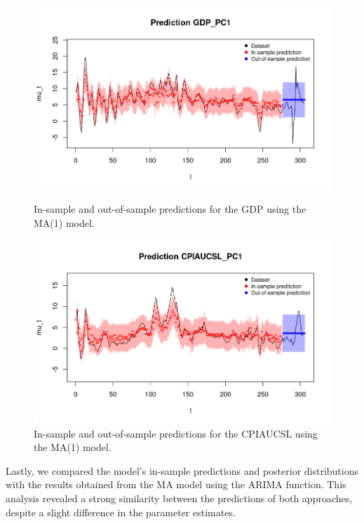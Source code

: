 \begin{figure}[H]
    \centering
    \begin{minipage}{0.49\textwidth}
        \centering
        \includegraphics[width=\textwidth]{images/3-MA/gdp_prediction.png}
        \caption{In-sample and out-of-sample predictions for the GDP using the MA(1) model.}
        \label{fig:MA1_gdp_prediction}
    \end{minipage}\hfill
    \begin{minipage}{0.49\textwidth}
        \centering
        \includegraphics[width=\textwidth]{images/3-MA/infl_prediction.png}
        \caption{In-sample and out-of-sample predictions for the CPIAUCSL using the MA(1) model.}
        \label{fig:MA1_infl_prediction}
    \end{minipage}
\end{figure}
Lastly, we compared the model's in-sample predictions and posterior distributions with the results obtained from the MA model using the ARIMA function. This analysis revealed a strong similarity between the predictions of both approaches, despite a slight difference in the parameter estimates.
